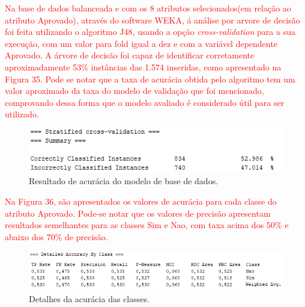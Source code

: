 \par
\textcolor{red}{Na base de dados balanceada e com os 8 atributos selecionados(em relação ao atributo Aprovado), através do software WEKA, á análise por arvore de decisão foi feita utilizando o algoritmo J48, usando a opção \textit{cross-validation} para a sua execução, com um valor para fold igual a dez e com a variável dependente Aprovado. A árvore de decisão foi capaz de identificar corretamente aproximadamente 53\% instâncias das 1.574 inseridas, como apresentado na Figura 35. Pode se notar que a taxa de acurácia obtida pelo algoritmo tem um valor aproximado da taxa do modelo de validação que foi mencionado, comprovando dessa forma que o modelo avaliado é considerado útil para ser utilizado.}

\par
\begin{figure}[!htp]
	\begin{center}
    \caption{\label{fig:waveform_fig} Resultado de acurácia do modelo de base de dados.}
	\includegraphics[scale=0.99]{Figuras/Resultado_acuracia.png}
	\end{center}
\end{figure}

\par
\textcolor{red}{Na Figura 36, são apresentados os valores de acurácia para cada classe do atributo Aprovado. Pode-se notar que os valores de precisão apresentam resultados semelhantes para as classes Sim e Nao, com taxa acima dos 50\% e abaixo dos 70\% de precisão.}

\par
\begin{figure}[!htp]
	\begin{center}
    \caption{\label{fig:waveform_fig} Detalhes da acurácia das classes.}
	\includegraphics[scale=0.93]{Figuras/Tabela_de_acuracia_das_classes.png}
	\end{center}
\end{figure}

